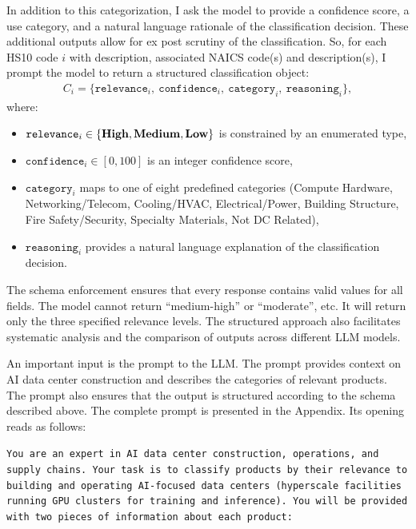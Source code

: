 \documentclass[12pt,pdftex]{article}
\newenvironment{prompt}{\par\medskip\noindent}{\par\medskip}
\begin{document}
\begin{onehalfspacing}
In addition to this categorization, I ask the model to provide a confidence score, a use category, and a natural language rationale of the classification decision. These additional outputs allow for ex post scrutiny of the classification. So, for each HS10 code $i$ with description, associated NAICS code(s) and description(s), I prompt the model to return a structured classification object:
\begin{align*}
    C_i = \{\texttt{relevance}_i, \ \texttt{confidence}_i, \ \texttt{category}_i, \ \texttt{reasoning}_i\},
\end{align*}
\noindent where:
\begin{itemize}
    \item $\texttt{relevance}_i \in \{\text{\textbf{High}}, \text{\textbf{Medium}}, \text{\textbf{Low}}\}$ is constrained by an enumerated type,
    \item $\texttt{confidence}_i \in [0, 100]$ is an integer confidence score,
    \item $\texttt{category}_i$ maps to one of eight predefined categories (Compute Hardware, Networking/Telecom, Cooling/HVAC, Electrical/Power, Building Structure, Fire Safety/Security, Specialty Materials, Not DC Related),
    \item $\texttt{reasoning}_i$ provides a natural language explanation of the classification decision.
\end{itemize}
The schema enforcement ensures that every response contains valid values for all fields. The model cannot return ``medium-high'' or ``moderate'', etc. It will return only the three specified relevance levels. The structured approach also facilitates systematic analysis and the comparison of outputs across different LLM models.

An important input is the prompt to the LLM. The prompt provides context on AI data center construction and describes the categories of relevant products. The prompt also ensures that the output is structured according to the schema described above. The complete prompt is presented in the Appendix. Its opening reads as follows:
\begin{prompt}
\texttt{You are an expert in AI data center construction, operations, and supply chains. Your task is to classify products by their relevance to building and operating AI-focused data centers (hyperscale facilities running GPU clusters for training and inference). You will be provided with two pieces of information about each product:}\\


\end{prompt}
\end{onehalfspacing}
\end{document}
